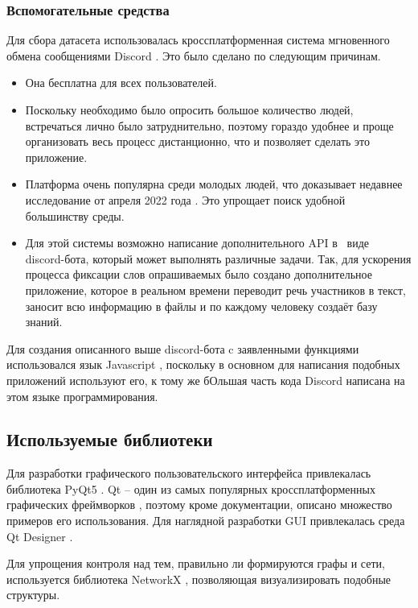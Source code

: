 \subsubsection{Вспомогательные средства}
Для сбора датасета использовалась кроссплатформенная система мгновенного обмена сообщениями Discord \cite{discord}. Это было сделано по следующим причинам.
\begin{itemize}
	\item Она бесплатна для всех пользователей.
	\item Поскольку необходимо было опросить большое количество людей, встречаться лично было затруднительно, поэтому гораздо удобнее и проще организовать весь процесс дистанционно, что и позволяет сделать это приложение.
	\item Платформа очень популярна среди молодых людей, что доказывает недавнее исследование от апреля 2022 года \cite{discordS}. Это упрощает поиск удобной большинству среды. 
	\item Для этой системы возможно написание дополнительного API в \, виде \, discord-бота, который может выполнять различные задачи. Так, для ускорения процесса фиксации слов опрашиваемых было создано дополнительное приложение, которое в реальном времени переводит речь участников в текст, заносит всю информацию в файлы и по каждому человеку создаёт базу знаний.
\end{itemize}

Для создания описанного выше discord-бота c заявленными функциями использовался язык Javascript \cite{javascript}, поскольку в основном для написания подобных приложений используют его, к тому же бОльшая часть кода Discord написана на этом языке программирования.\newline

\subsection{Используемые библиотеки}
Для разработки графического пользовательского интерфейса привлекалась библиотека PyQt5 \cite{pyqt5}. Qt -- один из самых популярных кроссплатформенных графических фреймворков \cite{qt}, поэтому кроме документации, описано множество примеров его использования. Для наглядной разработки GUI привлекалась среда Qt Designer \cite{qtdesigner}.

Для упрощения контроля над тем, правильно ли формируются графы и сети, используется библиотека NetworkX \cite{networkx}, позволяющая визуализировать подобные структуры. 

